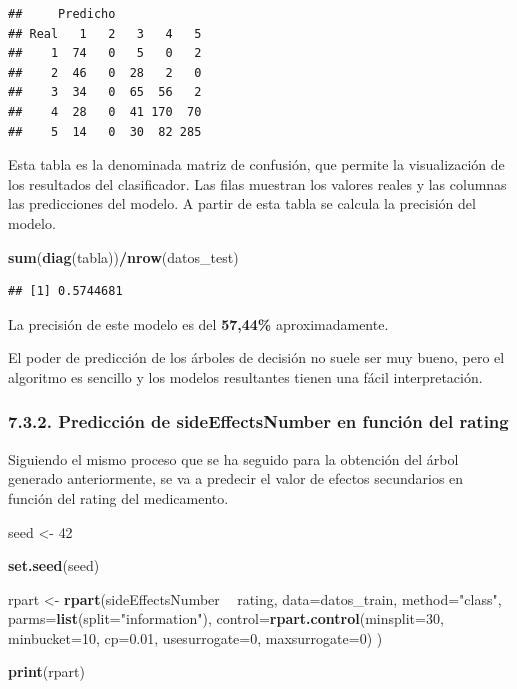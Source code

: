 \documentclass[spanish,]{article}
\newenvironment{Shaded}{\begin{snugshade}}{\end{snugshade}}
\newcommand{\KeywordTok}[1]{\textcolor[rgb]{0.13,0.29,0.53}{\textbf{#1}}}
\newcommand{\DataTypeTok}[1]{\textcolor[rgb]{0.13,0.29,0.53}{#1}}
\newcommand{\DecValTok}[1]{\textcolor[rgb]{0.00,0.00,0.81}{#1}}
\newcommand{\FloatTok}[1]{\textcolor[rgb]{0.00,0.00,0.81}{#1}}
\newcommand{\StringTok}[1]{\textcolor[rgb]{0.31,0.60,0.02}{#1}}
\newcommand{\OperatorTok}[1]{\textcolor[rgb]{0.81,0.36,0.00}{\textbf{#1}}}
\newcommand{\NormalTok}[1]{#1}
\begin{document}
\begin{verbatim}
##     Predicho
## Real   1   2   3   4   5
##    1  74   0   5   0   2
##    2  46   0  28   2   0
##    3  34   0  65  56   2
##    4  28   0  41 170  70
##    5  14   0  30  82 285
\end{verbatim}

Esta tabla es la denominada matriz de confusión, que permite la
visualización de los resultados del clasificador. Las filas muestran los
valores reales y las columnas las predicciones del modelo. A partir de
esta tabla se calcula la precisión del modelo.

\begin{Shaded}
\begin{Highlighting}[]
\KeywordTok{sum}\NormalTok{(}\KeywordTok{diag}\NormalTok{(tabla))}\OperatorTok{/}\KeywordTok{nrow}\NormalTok{(datos_test)}
\end{Highlighting}
\end{Shaded}

\begin{verbatim}
## [1] 0.5744681
\end{verbatim}

La precisión de este modelo es del \textbf{57,44\%} aproximadamente.

El poder de predicción de los árboles de decisión no suele ser muy
bueno, pero el algoritmo es sencillo y los modelos resultantes tienen
una fácil interpretación.

\subsubsection{7.3.2. Predicción de sideEffectsNumber en función del
rating}\label{prediccion-de-sideeffectsnumber-en-funcion-del-rating}

Siguiendo el mismo proceso que se ha seguido para la obtención del árbol
generado anteriormente, se va a predecir el valor de efectos secundarios
en función del rating del medicamento.

\begin{Shaded}
\begin{Highlighting}[]
\NormalTok{seed <-}\StringTok{ }\DecValTok{42}

\KeywordTok{set.seed}\NormalTok{(seed)}

\NormalTok{rpart <-}\StringTok{ }\KeywordTok{rpart}\NormalTok{(sideEffectsNumber }\OperatorTok{~}\StringTok{ }\NormalTok{rating, }\DataTypeTok{data=}\NormalTok{datos_train,}
                \DataTypeTok{method=}\StringTok{"class"}\NormalTok{,}
                \DataTypeTok{parms=}\KeywordTok{list}\NormalTok{(}\DataTypeTok{split=}\StringTok{"information"}\NormalTok{),}
                \DataTypeTok{control=}\KeywordTok{rpart.control}\NormalTok{(}\DataTypeTok{minsplit=}\DecValTok{30}\NormalTok{,}
                \DataTypeTok{minbucket=}\DecValTok{10}\NormalTok{,}
                \DataTypeTok{cp=}\FloatTok{0.01}\NormalTok{,}
                \DataTypeTok{usesurrogate=}\DecValTok{0}\NormalTok{,}
                \DataTypeTok{maxsurrogate=}\DecValTok{0}\NormalTok{)}
\NormalTok{              )}


\KeywordTok{print}\NormalTok{(rpart)}
\end{Highlighting}
\end{Shaded}
\end{document}
